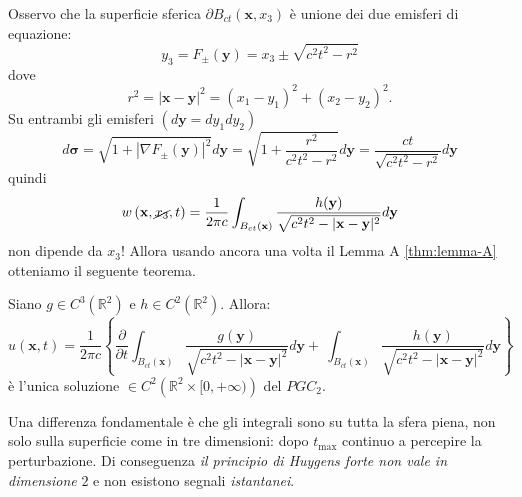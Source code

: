 \documentclass[10pt,a4paper,twoside,openright]{book}
\begin{document}
Osservo che la superficie sferica $\displaystyle \partial B_{ct}(\mathbf{x} ,x_{3})$ è unione dei due emisferi di equazione:
\begin{equation*}
	y_{3} =F_{\pm }(\mathbf{y}) =x_{3} \pm \sqrt{c^{2} t^{2} -r^{2}}
\end{equation*}
dove
\begin{equation*}
	r^{2} =| \mathbf{x} -\mathbf{y}| ^{2} =( x_{1} -y_{1})^{2} +( x_{2} -y_{2})^{2} .
\end{equation*}
Su entrambi gli emisferi $\displaystyle ( d\mathbf{y} =dy_{1} dy_{2})$
\begin{equation*}
	d\bm{\sigma } =\sqrt{1+| \nabla F_{\pm }(\mathbf{y})| ^{2}} d\mathbf{y} =\sqrt{1+\frac{r^{2}}{c^{2} t^{2} -r^{2}}} d\mathbf{y} =\frac{ct}{\sqrt{c^{2} t^{2} -r^{2}}} d\mathbf{y}
\end{equation*}
quindi
\begin{equation*}
	w\left(\mathbf{x} ,\cancel{x_{3}} ,t\right) =\frac{1}{2\pi c}\int _{B_{ct}(\mathbf{x})}\frac{h(\mathbf{y})}{\sqrt{c^{2} t^{2} -| \mathbf{x} -\mathbf{y}| ^{2}}} d\mathbf{y}
\end{equation*}
non dipende da $\displaystyle x_{3}$! Allora usando ancora una volta il Lemma A \ref{thm:lemma-A} otteniamo il seguente teorema.
\begin{theorem}
	 Siano $\displaystyle g\in C^{3}\left(\mathbb{R}^{2}\right)$ e $\displaystyle h\in C^{2}\left(\mathbb{R}^{2}\right)$. Allora:
	\begin{equation}
		u(\mathbf{x} ,t) =\frac{1}{2\pi c}\left\{\frac{\partial }{\partial t}\int _{B_{ct}(\mathbf{x})}\frac{g(\mathbf{y})}{\sqrt{c^{2} t^{2} -| \mathbf{x} -\mathbf{y}| ^{2}}} d\mathbf{y} +\ \int _{B_{ct}(\mathbf{x})}\frac{h(\mathbf{y})}{\sqrt{c^{2} t^{2} -| \mathbf{x} -\mathbf{y}| ^{2}}} d\mathbf{y}\right\}
	\end{equation}
	è l'unica soluzione $\displaystyle \in C^{2}\left(\mathbb{R}^{2} \times [ 0,+\infty )\right)$ del $\displaystyle PGC_{2}$.
\end{theorem}
Una differenza fondamentale è che gli integrali sono su tutta la sfera piena, non solo sulla superficie come in tre dimensioni: dopo $\displaystyle t_{\max}$ continuo a percepire la perturbazione. Di conseguenza \textit{il principio di Huygens forte non vale in dimensione }$\displaystyle 2$ e non esistono segnali \textit{istantanei}.
\end{document}
